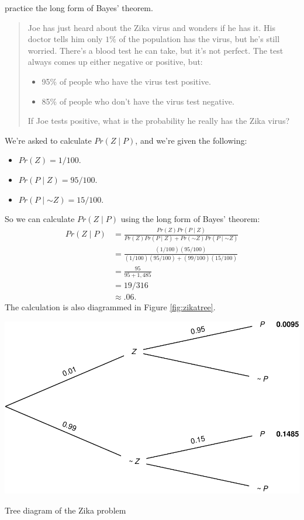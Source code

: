 \documentclass[justified]{tufte-book}
\providecommand{\tightlist}{%
  \setlength{\itemsep}{0pt}\setlength{\parskip}{0pt}}
\newcommand{\given}{\mid}
\renewcommand{\neg}{\mathbin{\sim}}
\newcommand{\p}{Pr}
\newenvironment{problem}{\begin{quote}\normalsize}{\end{quote}}
\theoremstyle{definition}
\theoremstyle{definition}
\theoremstyle{definition}
\theoremstyle{remark}
\begin{document}
 practice the long form of Bayes' theorem.

\begin{problem}
Joe has just heard about the Zika virus and wonders if he has it. His
doctor tells him only \(1\%\) of the population has the virus, but he's
still worried. There's a blood test he can take, but it's not perfect.
The test always comes up either negative or positive, but:

\begin{itemize}
\tightlist
\item
  95\% of people who have the virus test positive.
\item
  85\% of people who don't have the virus test negative.
\end{itemize}

If Joe tests positive, what is the probability he really has the Zika
virus?
\end{problem}

We're asked to calculate \(\p(Z \given P)\), and we're given the following:

\begin{itemize}
\tightlist
\item
  \(\p(Z) = 1/100\).
\item
  \(\p(P \given Z) = 95/100\).
\item
  \(\p(P \given \neg Z) = 15/100\).
\end{itemize}

So we can calculate \(\p(Z \given P)\) using the long form of Bayes' theorem:
\[
  \begin{aligned}
    \p(Z \given P) &= \frac{\p(Z)\p(P \given Z)}{\p(Z)\p(P \given Z) + \p(\neg Z)\p(P \given \neg Z)}\\
                   &= \frac{(1/100)(95/100)}{(1/100)(95/100) + (99/100)(15/100)}\\
                   &= \frac{95}{95 + 1,485}\\
                   &= 19/316\\
                   &\approx .06.
  \end{aligned}
\]
The calculation is also diagrammed in Figure \ref{fig:zikatree}.

\begin{marginfigure}
\includegraphics{_main_files/figure-latex/zikatree-1} \caption[Tree diagram of the Zika problem]{Tree diagram of the Zika problem}\label{fig:zikatree}
\end{marginfigure}
\end{document}
